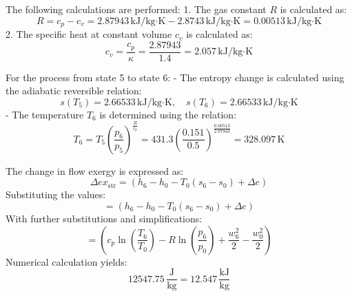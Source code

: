 The following calculations are performed:  
1. The gas constant \( R \) is calculated as:  
\[
R = c_p - c_v = 2.87943 \, \text{kJ/kg·K} - 2.8743 \, \text{kJ/kg·K} = 0.00513 \, \text{kJ/kg·K}
\]  
2. The specific heat at constant volume \( c_v \) is calculated as:  
\[
c_v = \frac{c_p}{\kappa} = \frac{2.87943}{1.4} = 2.057 \, \text{kJ/kg·K}
\]  

For the process from state 5 to state 6:  
- The entropy change is calculated using the adiabatic reversible relation:  
\[
s(T_5) = 2.66533 \, \text{kJ/kg·K}, \quad s(T_6) = 2.66533 \, \text{kJ/kg·K}
\]  
- The temperature \( T_6 \) is determined using the relation:  
\[
T_6 = T_5 \left( \frac{p_6}{p_5} \right)^{\frac{R}{c_p}} = 431.3 \left( \frac{0.151}{0.5} \right)^{\frac{0.00513}{2.87943}} = 328.097 \, \text{K}
\]

The change in flow exergy is expressed as:  
\[
\Delta ex_{\text{str}} = \left( h_6 - h_0 - T_0(s_6 - s_0) + \Delta e \right)
\]  
Substituting the values:  
\[
= \left( h_6 - h_0 - T_0(s_6 - s_0) + \Delta e \right)
\]  
With further substitutions and simplifications:  
\[
= \left( c_p \ln\left(\frac{T_6}{T_0}\right) - R \ln\left(\frac{p_6}{p_0}\right) + \frac{w_6^2}{2} - \frac{w_0^2}{2} \right)
\]  
Numerical calculation yields:  
\[
12547.75 \, \frac{\text{J}}{\text{kg}} = 12.547 \, \frac{\text{kJ}}{\text{kg}}
\]